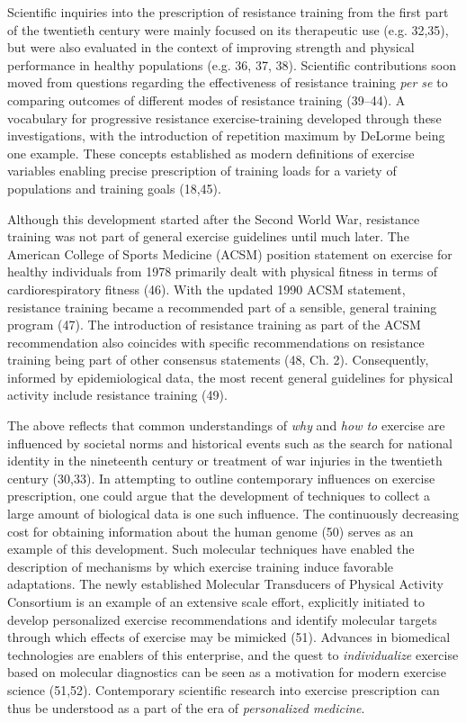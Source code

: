 \documentclass[twoside,10pt]{gihclass} %
\begin{document}
Scientific inquiries into the prescription of resistance training from the first part of the twentieth century were mainly focused on its therapeutic use
(e.g. 32,35),
but were also evaluated in the context of improving strength and physical performance in healthy populations
(e.g. 36, 37, 38).
Scientific contributions soon moved from questions regarding the effectiveness of resistance training \emph{per se} to comparing outcomes of different modes of resistance training
(39--44).
A vocabulary for progressive resistance exercise-training developed through these investigations, with
the introduction of repetition maximum by DeLorme being one example. These concepts established as modern definitions of exercise variables enabling precise prescription of training loads for a variety of populations and training goals
(18,45).

Although this development started after the Second World War, resistance training was not part of general exercise guidelines until much later.
The American College of Sports Medicine (ACSM) position statement on exercise for healthy individuals from 1978 primarily dealt with physical fitness in terms of cardiorespiratory fitness
(46).
With the updated 1990 ACSM statement, resistance training became a recommended part of a sensible, general training program
(47).
The introduction of resistance training as part of the ACSM recommendation also coincides with specific recommendations on resistance training being part of other consensus statements
(48, Ch. 2).
Consequently, informed by epidemiological data, the most recent general guidelines for physical activity include resistance training (49).

The above reflects that common understandings of \emph{why} and \emph{how to} exercise are influenced by societal norms and historical events such as the search for national identity in the nineteenth century or treatment of war injuries in the twentieth century
(30,33).
In attempting to outline contemporary influences on exercise prescription, one could argue that the development of techniques to collect a large amount of biological data is one such influence. The continuously decreasing cost for obtaining information about the human genome
(50) serves as an example of this development.
Such molecular techniques have enabled the description of mechanisms by which exercise training induce favorable adaptations. The newly established Molecular Transducers of Physical Activity Consortium is an example of an extensive scale effort, explicitly initiated to develop personalized exercise recommendations and identify molecular targets through which effects of exercise may be mimicked
(51).
Advances in biomedical technologies are enablers of this enterprise, and the quest to \emph{individualize} exercise based on molecular diagnostics can be seen as a motivation for modern exercise science
(51,52).
Contemporary scientific research into exercise prescription can thus be understood as a part of the era of \emph{personalized medicine}.
\end{document}
